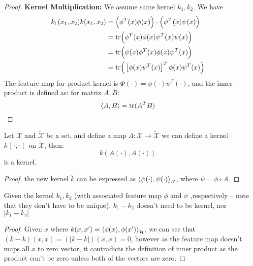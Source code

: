 \begin{proof}
    \textbf{Kernel Multiplication: } We assume same kernel $k_1, k_2$. We have 
    \begin{equation*}
    \begin{aligned}
        k_1(x_1, x_2)k(x_1, x_2) &= \Big(\phi^T(x)\phi(x)\Big)\cdot\Big(\psi^T(x)\psi(x)\Big)\\
        &= \text{tr}\Big(\phi^T(x)\phi(x)\psi^T(x)\psi(x)\Big) \\
        &= \text{tr}\Big(\psi(x)\phi^T(x)\phi(x)\psi^T(x)\Big) \\
        &= \text{tr}\Big(\left[ \phi(x)\psi^T(x) \right]^T\phi(x)\psi^T(x)\Big) \\
    \end{aligned}
    \end{equation*}
    The feature map for product kernel is $\Phi(\cdot) = \phi(\cdot)\psi^T(\cdot)$, and the inner product is defined as: for matrix $A, B$: 
    \begin{equation*}
        \left\langle A, B \right\rangle = \text{tr}(A^TB)
    \end{equation*}
\end{proof}

\begin{proposition}
    Let $ \mathcal{X} $ and $\tilde{\mathcal{X}}$ be a set, and define a map $A:\mathcal{X}\rightarrow\tilde{\mathcal{X}}$ we can define a kernel $k(\cdot, \cdot)$ on $\tilde{\mathcal{X}}$, then:
    \begin{equation*}
        k(A(\cdot), A(\cdot))
    \end{equation*}
    is a kernel. 
\end{proposition}
\begin{proof}
    the new kernel $\tilde{k}$ can be expressed as $\left\langle \psi(\cdot), \psi(\cdot) \right\rangle_{\tilde{\mathcal{X}}}$, where $\psi = \phi\circ A$.
\end{proof}

\begin{proposition}
    Given the kernel $k_1, k_2$ (with associated feature map $\phi$ and $\psi$ ,respectively -- note that they don't have to be unique), $k_1-k_2$ doesn't need to be kernel, nor $|k_1-k_2|$
\end{proposition}
\begin{proof}
    Given $x$ where $k(x, x')=\left\langle \phi(x),\phi(x') \right\rangle_\mathcal{H}$, we can see that $(k - k)(x, x) = (|k-k|)(x, x) = 0$, however as the feature map doesn't maps all $x$ to zero vector, it contradicts the definition of inner product as the product can't be zero unless both of the vectors are zero.
\end{proof}

